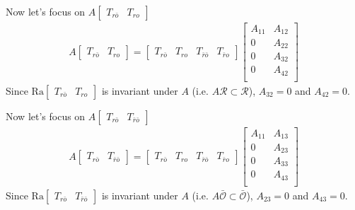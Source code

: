 \documentclass[twoside]{article}
\begin{document}
Now let's focus on $A \left[ \begin{array}{c|c} T_{r\bar{o}} & T_{ro} \end{array} \right]$
%
\begin{align*}
    A \left[ \begin{array}{c|c} T_{r\bar{o}} & T_{ro} \end{array} \right] = \left[ \begin{array}{c|c|c|c} T_{r\bar{o}} & T_{ro} & T_{\bar{r} \bar{o}} & T_{\bar{r} o} \end{array} \right]
    \left[ \begin{array}{c|c} A_{11} & A_{12} \\ \hline 
    0 & A_{22} \\ \hline 
    0 & A_{32} \\ \hline 
    0 & A_{42} \\ 
    \end{array} \right]
\end{align*}
%
Since $\mathrm{Ra}\left[ \begin{array}{c|c} T_{r\bar{o}} & T_{ro} \end{array} \right]$ is invariant under $A$ (i.e. $A \mathcal{R} \subset \mathcal{R}$), $A_{32} = 0$ and $A_{42} = 0$. 

Now let's focus on $A \left[ \begin{array}{c|c} T_{r\bar{o}} & T_{\bar{r}\bar{o}} \end{array} \right]$
%
\begin{align*}
    A \left[ \begin{array}{c|c} T_{r\bar{o}} & T_{\bar{r}\bar{o}} \end{array} \right] = \left[ \begin{array}{c|c|c|c} T_{r\bar{o}} & T_{ro} & T_{\bar{r}\bar{o}} & T_{\bar{r} o} \end{array} \right]
    \left[ \begin{array}{c|c} A_{11} & A_{13} \\ \hline 
    0 & A_{23} \\ \hline 
    0 & A_{33} \\ \hline 
    0 & A_{43} \\ 
    \end{array} \right]
\end{align*}
%
Since $\mathrm{Ra}\left[ \begin{array}{c|c} T_{r\bar{o}} & T_{\bar{r}\bar{o}} \end{array} \right]$ is invariant under $A$ (i.e. $A \bar{\mathcal{O}} \subset \bar{\mathcal{O}}$), $A_{23} = 0$ and $A_{43} = 0$. 
\end{document}
